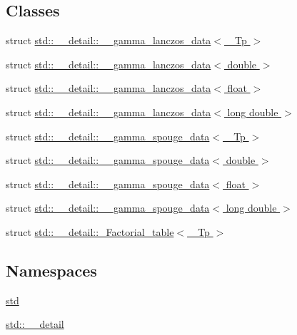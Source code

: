 \subsection*{Classes}
\begin{DoxyCompactItemize}
\item 
struct \hyperlink{structstd_1_1____detail_1_1____gamma__lanczos__data}{std\+::\+\_\+\+\_\+detail\+::\+\_\+\+\_\+gamma\+\_\+lanczos\+\_\+data$<$ \+\_\+\+Tp $>$}
\item 
struct \hyperlink{structstd_1_1____detail_1_1____gamma__lanczos__data_3_01double_01_4}{std\+::\+\_\+\+\_\+detail\+::\+\_\+\+\_\+gamma\+\_\+lanczos\+\_\+data$<$ double $>$}
\item 
struct \hyperlink{structstd_1_1____detail_1_1____gamma__lanczos__data_3_01float_01_4}{std\+::\+\_\+\+\_\+detail\+::\+\_\+\+\_\+gamma\+\_\+lanczos\+\_\+data$<$ float $>$}
\item 
struct \hyperlink{structstd_1_1____detail_1_1____gamma__lanczos__data_3_01long_01double_01_4}{std\+::\+\_\+\+\_\+detail\+::\+\_\+\+\_\+gamma\+\_\+lanczos\+\_\+data$<$ long double $>$}
\item 
struct \hyperlink{structstd_1_1____detail_1_1____gamma__spouge__data}{std\+::\+\_\+\+\_\+detail\+::\+\_\+\+\_\+gamma\+\_\+spouge\+\_\+data$<$ \+\_\+\+Tp $>$}
\item 
struct \hyperlink{structstd_1_1____detail_1_1____gamma__spouge__data_3_01double_01_4}{std\+::\+\_\+\+\_\+detail\+::\+\_\+\+\_\+gamma\+\_\+spouge\+\_\+data$<$ double $>$}
\item 
struct \hyperlink{structstd_1_1____detail_1_1____gamma__spouge__data_3_01float_01_4}{std\+::\+\_\+\+\_\+detail\+::\+\_\+\+\_\+gamma\+\_\+spouge\+\_\+data$<$ float $>$}
\item 
struct \hyperlink{structstd_1_1____detail_1_1____gamma__spouge__data_3_01long_01double_01_4}{std\+::\+\_\+\+\_\+detail\+::\+\_\+\+\_\+gamma\+\_\+spouge\+\_\+data$<$ long double $>$}
\item 
struct \hyperlink{structstd_1_1____detail_1_1__Factorial__table}{std\+::\+\_\+\+\_\+detail\+::\+\_\+\+Factorial\+\_\+table$<$ \+\_\+\+Tp $>$}
\end{DoxyCompactItemize}
\subsection*{Namespaces}
\begin{DoxyCompactItemize}
\item 
 \hyperlink{namespacestd}{std}
\item 
 \hyperlink{namespacestd_1_1____detail}{std\+::\+\_\+\+\_\+detail}
\end{DoxyCompactItemize}
